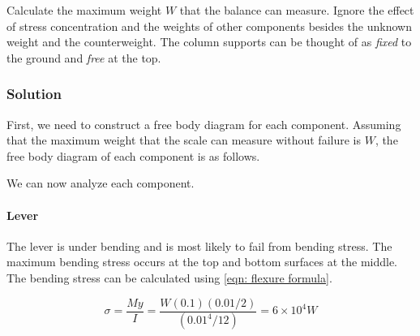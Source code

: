 \documentclass[
10pt,
a4paper,
openany,
svgnames,
]{book}
\begin{document}
Calculate the maximum weight $W$ that the balance can measure. Ignore the effect of stress concentration and the weights of other components besides the unknown weight and the counterweight. The column supports can be thought of as \emph{fixed} to the ground and \emph{free} at the top.

\subsubsection{Solution}

First, we need to construct a free body diagram for each component. Assuming that the maximum weight that the scale can measure without failure is $W$, the free body diagram of each component is as follows.

\begin{figure}
  \centering
\end{figure}

We can now analyze each component.

\paragraph{Lever}

The lever is under bending and is most likely to fail from bending stress. The maximum bending stress occurs at the top and bottom surfaces at the middle. The bending stress can be calculated using \cref{eqn: flexure formula}. 

\[\sigma  = \frac{My}{I} = \frac{W(0.1)(0.01/2)}{(0.01^4/12)} = 6 \times
  10^4W\]
\end{document}

